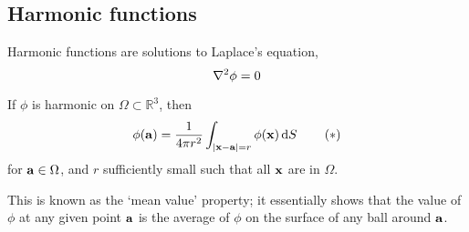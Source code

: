 \subsection{Harmonic functions}
Harmonic functions are solutions to Laplace's equation,
\[
	\laplacian{\phi} = 0
\]
\begin{proposition}
	If \(\phi\) is harmonic on \(\Omega \subset \mathbb R^3\), then
	\begin{equation}
		\phi(\vb a) = \frac{1}{4 \pi r^2} \int_{\abs{\vb x - \vb a} = r} \phi(\vb x) \dd{S}\tag{\(\ast\)}
	\end{equation}
	for \(\vb a \in \Omega\), and \(r\) sufficiently small such that all \(\vb x\) are in \(\Omega\).
\end{proposition}
\noindent This is known as the `mean value' property; it essentially shows that the value of \(\phi\) at any given point \(\vb a\) is the average of \(\phi\) on the surface of any ball around \(\vb a\).
